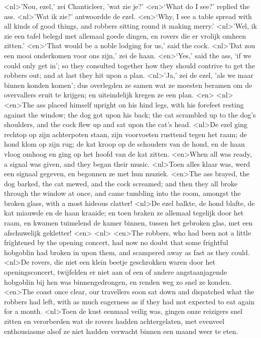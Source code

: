 <nl>'Nou, ezel,' zei Chanticleer, 'wat zie je?'
<en>‘What do I see?’ replied the ass.
<nl>'Wat ik zie?' antwoordde de ezel.
<en>‘Why, I see a table spread with all kinds of good things, and robbers sitting round it making merry.’
<nl>'Wel, ik zie een tafel belegd met allemaal goede dingen, en rovers die er vrolijk omheen zitten.'
<en>‘That would be a noble lodging for us,’ said the cock.
<nl>'Dat zou een mooi onderkomen voor ons zijn,' zei de haan.
<en>‘Yes,’ said the ass, ‘if we could only get in’; so they consulted together how they should contrive to get the robbers out; and at last they hit upon a plan.
<nl>'Ja,' zei de ezel, 'als we maar binnen konden komen'; dus overlegden ze samen wat  ze  moesten beramen om de overvallers eruit te krijgen; en uiteindelijk kregen ze een plan.
<en>
<nl>
<en>The ass placed himself upright on his hind legs, with his forefeet resting against the window; the dog got upon his back; the cat scrambled up to the dog’s shoulders, and the cock flew up and sat upon the cat’s head.
<nl>De ezel ging rechtop op zijn achterpoten staan, zijn voorvoeten rusttend tegen het raam; de hond klom op zijn rug; de kat kroop op  de schouders van de hond, en de haan vloog omhoog en ging op het hoofd van de kat zitten.
<en>When all was ready, a signal was given, and they began their music.
<nl>Toen alles klaar was, werd  een signaal gegeven, en begonnen ze met hun muziek.
<en>The ass brayed, the dog barked, the cat mewed, and the cock screamed; and then they all broke through the window at once, and came tumbling into the room, amongst the broken glass, with a most hideous clatter!
<nl>De ezel balkte, de hond blafte, de kat miauwde en de haan kraaide; en toen braken ze allemaal tegelijk door het raam, en kwamen tuimelend de kamer binnen, tussen het gebroken glas, met een  afschuwelijk gekletter!
<en>
<nl>
<en>The robbers, who had been not a little frightened by the opening concert, had now no doubt that some frightful hobgoblin had broken in upon them, and scampered away as fast as they could.
<nl>De rovers, die niet een klein beetje geschrokken waren door het openingsconcert, twijfelden er niet aan of een of andere angstaanjagende hobgoblin bij hen was binnengedrongen, en renden weg zo snel ze konden.
<en>The coast once clear, our travellers soon sat down and dispatched what the robbers had left, with as much eagerness as if they had not expected to eat again for a month.
<nl>Toen de kust eenmaal veilig was, gingen onze reizigers snel zitten en verorberden wat de rovers hadden achtergelaten, met evenveel enthousiasme alsof ze niet hadden verwacht binnen een maand weer te eten.
